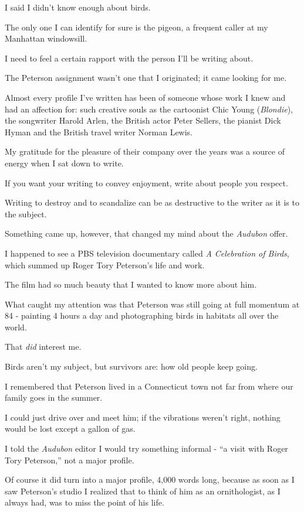 \documentclass{book}
\numberwithin{equation}{section}
\begin{document}
I said I didn't know enough about birds.

The only one I can identify for sure is the pigeon, a frequent caller at my Manhattan windowsill.

%
I need to feel a certain rapport with the person I'll be writing about.

The Peterson assignment wasn't one that I originated; it came looking for me.

Almost every profile I've written has been of someone whose work I knew and had an affection for: such creative souls as the cartoonist Chic Young (\textit{Blondie}), the songwriter Harold Arlen, the British actor Peter Sellers, the pianist Dick Hyman and the British travel writer Norman Lewis.

My gratitude for the pleasure of their company over the years was a source of energy when I sat down to write.

If you want your writing to convey enjoyment, write about people you respect.

Writing to destroy and to scandalize can be as destructive to the writer as it is to the subject.

%
Something came up, however, that changed my mind about the \textit{Audubon} offer.

I happened to see a PBS television documentary called \textit{A Celebration of Birds}, which summed up Roger Tory Peterson's life and work.

The film had so much beauty that I wanted to know more about him.

What caught my attention was that Peterson was still going at full momentum at 84 - painting 4 hours a day and photographing birds in habitats all over the world.

That \textit{did} interest me.

Birds aren't my subject, but survivors are: how old people keep going.

I remembered that Peterson lived in a Connecticut town not far from where our family goes in the summer.

I could just drive over and meet him; if the vibrations weren't right, nothing would be lost except a gallon of gas.

I told the \textit{Audubon} editor I would try something informal - ``a visit with Roger Tory Peterson,'' not a major profile.

%
Of course it did turn into a major profile, 4,000 words long, because as soon as I saw Peterson's studio I realized that to think of him as an ornithologist, as I always had, was to miss the point of his life.
\end{document}

